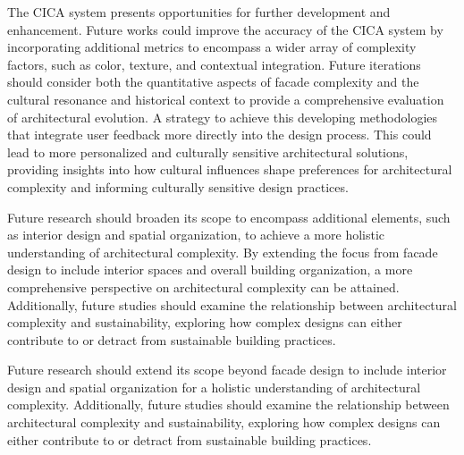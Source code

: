 The CICA system presents opportunities for further development and enhancement.
Future works could improve the accuracy of the CICA system by incorporating additional metrics to encompass a wider array of complexity factors, such as color, texture, and contextual integration.
Future iterations should consider both the quantitative aspects of facade complexity and the cultural resonance and historical context to provide a comprehensive evaluation of architectural evolution.
A strategy to achieve this developing methodologies that integrate user feedback more directly into the design process.
This could lead to more personalized and culturally sensitive architectural solutions, providing insights into how cultural influences shape preferences for architectural complexity and informing culturally sensitive design practices.


Future research should broaden its scope to encompass additional elements, such as interior design and spatial organization, to achieve a more holistic understanding of architectural complexity.
By extending the focus from facade design to include interior spaces and overall building organization, a more comprehensive perspective on architectural complexity can be attained.
Additionally, future studies should examine the relationship between architectural complexity and sustainability, exploring how complex designs can either contribute to or detract from sustainable building practices.

Future research should extend its scope beyond facade design to include interior design and spatial organization for a holistic understanding of architectural complexity.
Additionally, future studies should examine the relationship between architectural complexity and sustainability, exploring how complex designs can either contribute to or detract from sustainable building practices.
